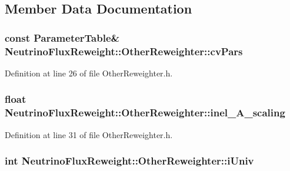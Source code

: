 \subsection{Member Data Documentation}
\hypertarget{class_neutrino_flux_reweight_1_1_other_reweighter_a8dd49509293e302c005023668d153011}{
\subsubsection[{cv\-Pars}]{\setlength{\rightskip}{0pt plus 5cm}const {\bf Parameter\-Table}\& Neutrino\-Flux\-Reweight\-::\-Other\-Reweighter\-::cv\-Pars}}\label{class_neutrino_flux_reweight_1_1_other_reweighter_a8dd49509293e302c005023668d153011}


Definition at line 26 of file Other\-Reweighter.\-h.

\hypertarget{class_neutrino_flux_reweight_1_1_other_reweighter_a8474c645b633b52935902771b36ac183}{
\subsubsection[{inel\-\_\-\-A\-\_\-scaling}]{\setlength{\rightskip}{0pt plus 5cm}float Neutrino\-Flux\-Reweight\-::\-Other\-Reweighter\-::inel\-\_\-\-A\-\_\-scaling\hspace{0.3cm}{\ttfamily [private]}}}\label{class_neutrino_flux_reweight_1_1_other_reweighter_a8474c645b633b52935902771b36ac183}


Definition at line 31 of file Other\-Reweighter.\-h.

\hypertarget{class_neutrino_flux_reweight_1_1_other_reweighter_a8a778b0c554b88244ca4514c693d0e41}{
\subsubsection[{i\-Univ}]{\setlength{\rightskip}{0pt plus 5cm}int Neutrino\-Flux\-Reweight\-::\-Other\-Reweighter\-::i\-Univ\hspace{0.3cm}{\ttfamily [private]}}}\label{class_neutrino_flux_reweight_1_1_other_reweighter_a8a778b0c554b88244ca4514c693d0e41}


